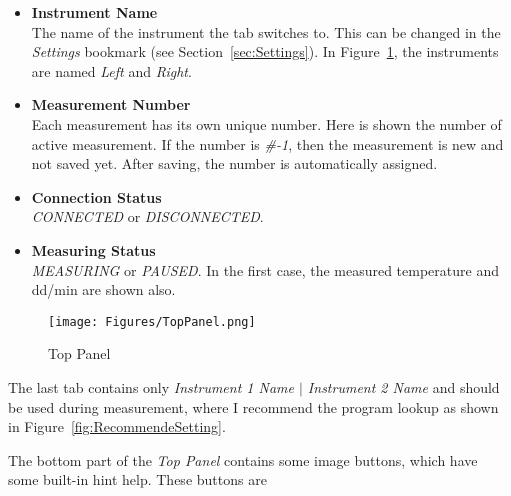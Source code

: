 \documentclass[a4paper,11pt,twoside]{book}
\theoremstyle{named}
\begin{document}
\begin{itemize}
  \item \textbf{Instrument Name} \\
    The name of the instrument the tab switches to. This can be changed in the
    \textit{Settings} bookmark (see Section~\ref{sec:Settings}). In
    Figure~\ref{fig:TopPanel}, the instruments are named \textit{Left} and
    \textit{Right}.
  \item \textbf{Measurement Number} \\
    Each measurement has its own unique number. Here is shown the number of
    active measurement. If the number is \textit{\#-1}, then the measurement is
    new and not saved yet. After saving, the number is automatically assigned.
  \item \textbf{Connection Status} \\
    \textit{CONNECTED} or \textit{DISCONNECTED}. 
  \item \textbf{Measuring Status} \\
    \textit{MEASURING} or \textit{PAUSED}. In the first case, the measured
    temperature and dd/min are shown also. 
\end{itemize}

\begin{figure}[t]
  \centering
  \texttt{[image: Figures/TopPanel.png]}
  \caption{Top Panel}
  \label{fig:TopPanel}
\end{figure}

The last tab contains only \textit{Instrument 1 Name $|$ Instrument 2 Name} and
should be used during measurement, where I recommend the program
lookup as shown in Figure~\ref{fig:RecommendeSetting}.

The bottom part of the \textit{Top Panel} contains some image buttons, which
have some built-in hint help. These buttons are
\end{document}
